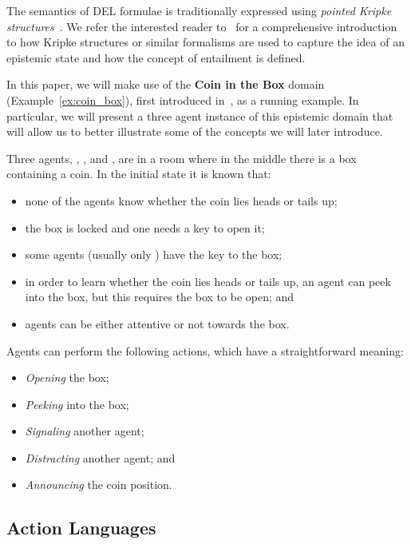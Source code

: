 	
	The semantics of DEL formulae is traditionally expressed using \emph{pointed Kripke structures}~\cite{Kripke1963-KRISCO}. We refer the interested reader to~\cite{fagin1994reasoning,bolander2017gentle,Gerbrandy1997} for a comprehensive introduction to how Kripke structures or similar formalisms are used to capture the idea of an epistemic state and how the concept of entailment is defined.
	
	In this paper, we will make use of the \textbf{Coin in the Box} domain (Example~\ref{ex:coin_box}), first introduced in~\cite{baral2015action}, as a running example. In particular, we will present a three agent instance of this epistemic domain that will allow us to better illustrate some of the concepts we will later introduce.
	
	\begin{example}\label{ex:coin_box}
	Three agents, , , and , are in a room where in the middle there
	is a box containing a coin. In the initial state it is known that:
	\begin{itemize}%
		\item none of the agents know whether the coin lies heads or tails up;
		\item the box is locked and one needs a key to open it;
		\item some agents (usually only ) have the key to the box;
		\item in order to learn whether the coin lies heads or tails up, an agent
		  can peek into the box, but this requires the box to be open; and
		\item agents can be either attentive or not towards the box.
	\end{itemize}
    Agents can perform the following actions, which have a straightforward meaning: 
	\begin{itemize}%
		\item\emph{Opening} the box;
		\item\emph{Peeking} into the box;
		\item\emph{Signaling} another agent; 
		\item\emph{Distracting} another agent; and
		\item\emph{Announcing} the coin position.
	\end{itemize}
\end{example}
		
\subsection{Action Languages}

